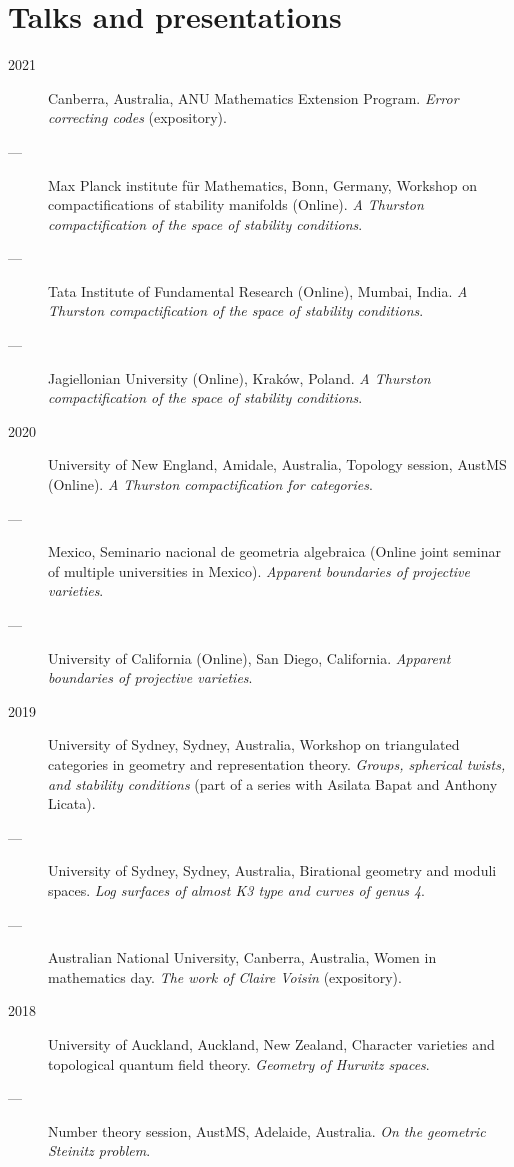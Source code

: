 \documentclass[11pt]{article}
\begin{document}
\section*{Talks and presentations}
\label{sec:org8c8e526}
\begin{description}
\item[{2021}] Canberra, Australia, ANU Mathematics Extension Program. \emph{Error correcting codes} (expository).
\item[{---}] Max Planck institute für Mathematics, Bonn, Germany, Workshop on compactifications of stability manifolds (Online). \emph{A Thurston compactification of the space of stability conditions}.
\item[{---}] Tata Institute of Fundamental Research (Online), Mumbai, India. \emph{A Thurston compactification of the space of stability conditions}.
\item[{---}] Jagiellonian University (Online), Kraków, Poland. \emph{A Thurston compactification of the space of stability conditions}.
\item[{2020}] University of New England, Amidale, Australia, Topology session, AustMS (Online). \emph{A Thurston compactification for categories}.
\item[{---}] Mexico, Seminario nacional de geometria algebraica (Online joint seminar of multiple universities in Mexico). \emph{Apparent boundaries of projective varieties}.
\item[{---}] University of California (Online), San Diego, California. \emph{Apparent boundaries of projective varieties}.
\item[{2019}] University of Sydney, Sydney, Australia, Workshop on triangulated categories in geometry and representation theory. \emph{Groups, spherical twists, and stability conditions} (part of a series with Asilata Bapat and Anthony Licata).
\item[{---}] University of Sydney, Sydney, Australia, Birational geometry and moduli spaces. \emph{Log surfaces of almost K3 type and curves of genus 4}.
\item[{---}] Australian National University, Canberra, Australia, Women in mathematics day. \emph{The work of Claire Voisin} (expository).
\item[{2018}] University of Auckland, Auckland, New Zealand, Character varieties and topological quantum field theory. \emph{Geometry of Hurwitz spaces}.
\item[{---}] Number theory session,  AustMS, Adelaide, Australia. \emph{On the geometric Steinitz problem}.

\end{description}
\end{document}
